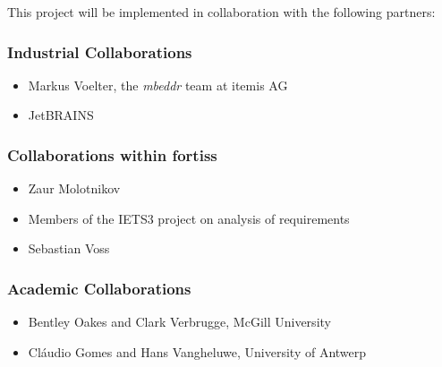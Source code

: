 This project will be implemented in collaboration with the following partners:

\subsubsection{Industrial Collaborations}
\begin{itemize}
  \item Markus Voelter, the \emph{mbeddr} team at itemis AG
  \item JetBRAINS
\end{itemize}

\subsubsection{Collaborations within fortiss}
\begin{itemize}
  \item Zaur Molotnikov
  \item Members of the IETS3 project on analysis of requirements
  \item Sebastian Voss
\end{itemize}

\subsubsection{Academic Collaborations}
\begin{itemize}
  \item Bentley Oakes and Clark Verbrugge, McGill University
  \item Cl\'audio Gomes and Hans Vangheluwe, University of Antwerp
\end{itemize}